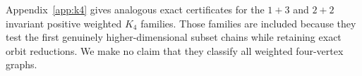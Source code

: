 Appendix~\ref{app:k4} gives analogous exact certificates for the $1+3$ and
$2+2$ invariant positive weighted $K_4$ families.  Those families are
included because they test the first genuinely higher-dimensional subset
chains while retaining exact orbit reductions.  We make no claim that they
classify all weighted four-vertex graphs.
